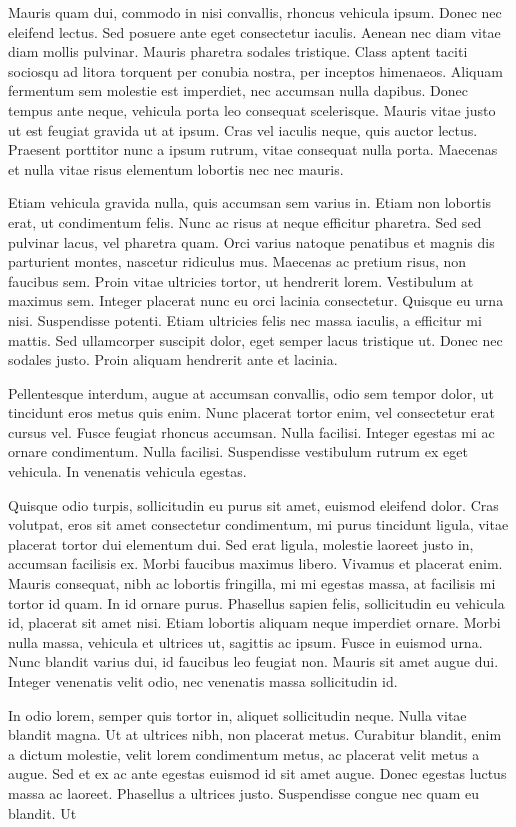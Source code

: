 Mauris quam dui, commodo in nisi convallis, rhoncus vehicula ipsum. Donec nec eleifend lectus. Sed posuere ante eget consectetur iaculis. Aenean nec diam vitae diam mollis pulvinar. Mauris pharetra sodales tristique. Class aptent taciti sociosqu ad litora torquent per conubia nostra, per inceptos himenaeos. Aliquam fermentum sem molestie est imperdiet, nec accumsan nulla dapibus. Donec tempus ante neque, vehicula porta leo consequat scelerisque. Mauris vitae justo ut est feugiat gravida ut at ipsum. Cras vel iaculis neque, quis auctor lectus. Praesent porttitor nunc a ipsum rutrum, vitae consequat nulla porta. Maecenas et nulla vitae risus elementum lobortis nec nec mauris.

Etiam vehicula gravida nulla, quis accumsan sem varius in. Etiam non lobortis erat, ut condimentum felis. Nunc ac risus at neque efficitur pharetra. Sed sed pulvinar lacus, vel pharetra quam. Orci varius natoque penatibus et magnis dis parturient montes, nascetur ridiculus mus. Maecenas ac pretium risus, non faucibus sem. Proin vitae ultricies tortor, ut hendrerit lorem. Vestibulum at maximus sem. Integer placerat nunc eu orci lacinia consectetur. Quisque eu urna nisi. Suspendisse potenti. Etiam ultricies felis nec massa iaculis, a efficitur mi mattis. Sed ullamcorper suscipit dolor, eget semper lacus tristique ut. Donec nec sodales justo. Proin aliquam hendrerit ante et lacinia.

Pellentesque interdum, augue at accumsan convallis, odio sem tempor dolor, ut tincidunt eros metus quis enim. Nunc placerat tortor enim, vel consectetur erat cursus vel. Fusce feugiat rhoncus accumsan. Nulla facilisi. Integer egestas mi ac ornare condimentum. Nulla facilisi. Suspendisse vestibulum rutrum ex eget vehicula. In venenatis vehicula egestas.

Quisque odio turpis, sollicitudin eu purus sit amet, euismod eleifend dolor. Cras volutpat, eros sit amet consectetur condimentum, mi purus tincidunt ligula, vitae placerat tortor dui elementum dui. Sed erat ligula, molestie laoreet justo in, accumsan facilisis ex. Morbi faucibus maximus libero. Vivamus et placerat enim. Mauris consequat, nibh ac lobortis fringilla, mi mi egestas massa, at facilisis mi tortor id quam. In id ornare purus. Phasellus sapien felis, sollicitudin eu vehicula id, placerat sit amet nisi. Etiam lobortis aliquam neque imperdiet ornare. Morbi nulla massa, vehicula et ultrices ut, sagittis ac ipsum. Fusce in euismod urna. Nunc blandit varius dui, id faucibus leo feugiat non. Mauris sit amet augue dui. Integer venenatis velit odio, nec venenatis massa sollicitudin id.

In odio lorem, semper quis tortor in, aliquet sollicitudin neque. Nulla vitae blandit magna. Ut at ultrices nibh, non placerat metus. Curabitur blandit, enim a dictum molestie, velit lorem condimentum metus, ac placerat velit metus a augue. Sed et ex ac ante egestas euismod id sit amet augue. Donec egestas luctus massa ac laoreet. Phasellus a ultrices justo. Suspendisse congue nec quam eu blandit. Ut